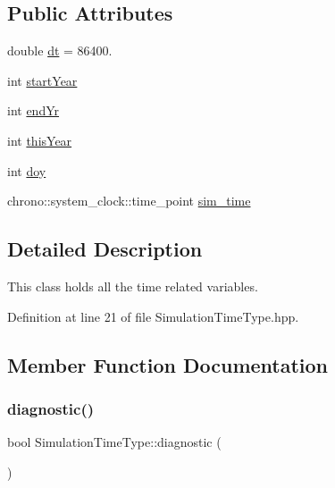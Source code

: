 \subsection*{Public Attributes}
\begin{DoxyCompactItemize}
\item 
double \mbox{\hyperlink{class_simulation_time_type_a47d3b95a336cd5be9672c48237301d4f}{dt}} = 86400.
\item 
int \mbox{\hyperlink{class_simulation_time_type_aaa632d7b7d9a2373e0e0fa8fffbbe122}{start\+Year}}
\item 
int \mbox{\hyperlink{class_simulation_time_type_af6197accafaf26492d16804698769660}{end\+Yr}}
\item 
int \mbox{\hyperlink{class_simulation_time_type_a1cd46f2a7b6924dec7aa98832a881c4e}{this\+Year}}
\item 
int \mbox{\hyperlink{class_simulation_time_type_a23da42b319f90f8ce0ea36f8c76946a5}{doy}}
\item 
chrono\+::system\+\_\+clock\+::time\+\_\+point \mbox{\hyperlink{class_simulation_time_type_a59eef0a521b5637639701bd7ad4fe73e}{sim\+\_\+time}}
\end{DoxyCompactItemize}


\subsection{Detailed Description}
This class holds all the time related variables. 

Definition at line 21 of file Simulation\+Time\+Type.\+hpp.



\subsection{Member Function Documentation}
\mbox{\label{class_simulation_time_type_a5ae58a97a898a812bcd24cf83ac5f6ea}} 
\subsubsection{\texorpdfstring{diagnostic()}{diagnostic()}}
{\footnotesize\ttfamily bool Simulation\+Time\+Type\+::diagnostic (\begin{DoxyParamCaption}{ }\end{DoxyParamCaption})\hspace{0.3cm}{\ttfamily [inline]}}

